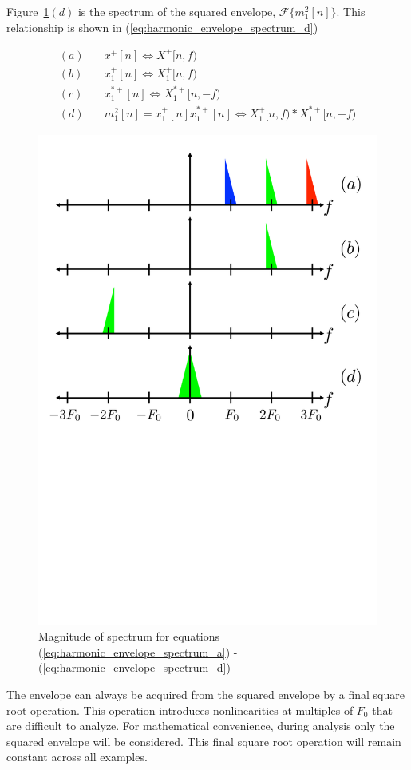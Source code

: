 \documentclass [11pt, proquest,oneside] {ganter_thesis}[2015/03/03]
\begin{document}
Figure~\ref{fig:harmonic_envelope}$(d)$ is the spectrum of the squared envelope, $\mathcal{F}\Big\{ m^2_1[n] \Big\}$.  This relationship is shown in (\ref{eq:harmonic_envelope_spectrum_d})

\begin{align}
\label{eq:harmonic_envelope_spectrum_a}
(a)& \quad x^+[n] \Longleftrightarrow X^+[n,f)  \\
(b)& \quad x^+_1[n] \Longleftrightarrow X^+_1[n,f) \\
(c)& \quad x^{*+}_1[n] \Longleftrightarrow X^{*+}_1[n,-f) \\
\label{eq:harmonic_envelope_spectrum_d}
(d)& \quad m_1^2[n] = x^+_1[n] x^{*+}_1[n] \Longleftrightarrow X^+_1[n,f) * X^{*+}_1[n,-f)
\end{align}

\begin{figure}[!ht]
  \centering
    \includegraphics[width=.62\textwidth]{harmonic_envelope}
        \caption{Magnitude of spectrum for equations (\ref{eq:harmonic_envelope_spectrum_a}) - (\ref{eq:harmonic_envelope_spectrum_d})}\label{fig:harmonic_envelope}
\end{figure}

The envelope can always be acquired from the squared envelope by a final square root operation.  This operation introduces nonlinearities at multiples of $F_0$ that are difficult to analyze.  For mathematical convenience, during analysis only the squared envelope will be considered.  This final square root operation will remain constant across all examples.
\end{document}
